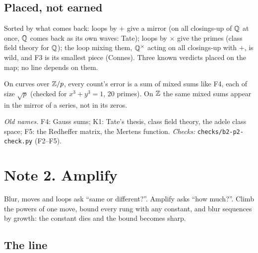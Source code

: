 \subsection*{Placed, not earned}

\begin{lines}
\item[\lab{K1}] [reported] Sorted by what comes back: loops by $+$ give a mirror (on all closings-up of $\mathbb{Q}$ at once, $\mathbb{Q}$ comes back as its own waves: Tate); loops by $\times$ give the primes (class field theory for $\mathbb{Q}$); the loop mixing them, $\mathbb{Q}^\times$ acting on all closings-up with $+$, is wild, and F3 is its smallest piece (Connes). Three known verdicts placed on the map; no line depends on them.
\item[\lab{K2}] [machine] On curves over $\mathbb{Z}/p$, every count's error is a sum of mixed sums like F4, each of size $\sqrt p$ (checked for $x^3 + y^3 = 1$, $20$ primes). On $\mathbb{Z}$ the same mixed sums appear in the mirror of a series, not in its zeros.
\end{lines}

\noindent\emph{Old names.} F4: Gauss sums; K1: Tate's thesis, class field theory, the adele class space; F5: the Redheffer matrix, the Mertens function. \emph{Checks:} \texttt{checks/b2-p2-check.py} (F2--F5).

\newpage
\section*{Note 2. Amplify}
\begin{center}
{\small Blur, moves and loops ask ``same or different?''. Amplify asks ``how much?''. Climb the powers of one move, bound every rung with any constant, and blur sequences by growth: the constant dies and the bound becomes sharp.}
\end{center}

\subsection*{The line}

